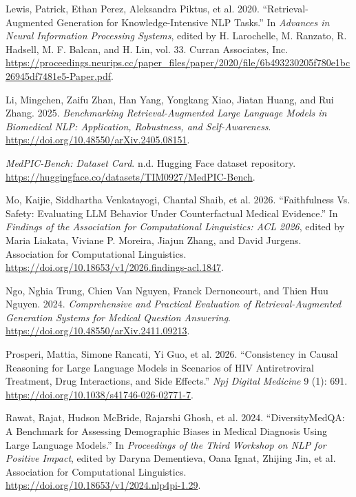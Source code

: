 \documentclass[
  english,
  11pt,
]{article}
\newlength{\cslhangindent}
\newenvironment{CSLReferences}[2] %
 {\begin{list}{}{%
  \setlength{\itemindent}{0pt}
  \setlength{\leftmargin}{0pt}
  \setlength{\parsep}{0pt}
  \ifodd #1
   \setlength{\leftmargin}{\cslhangindent}
   \setlength{\itemindent}{-1\cslhangindent}
  \fi
  \setlength{\itemsep}{#2\baselineskip}}}
 {\end{list}}
\begin{document}
\begin{CSLReferences}{1}{1}
Lewis, Patrick, Ethan Perez, Aleksandra Piktus, et al. 2020.
{``Retrieval-Augmented Generation for Knowledge-Intensive NLP Tasks.''}
In \emph{Advances in Neural Information Processing Systems}, edited by
H. Larochelle, M. Ranzato, R. Hadsell, M. F. Balcan, and H. Lin, vol.
33. Curran Associates, Inc.
\url{https://proceedings.neurips.cc/paper_files/paper/2020/file/6b493230205f780e1bc26945df7481e5-Paper.pdf}.

Li, Mingchen, Zaifu Zhan, Han Yang, Yongkang Xiao, Jiatan Huang, and Rui
Zhang. 2025. \emph{Benchmarking Retrieval-Augmented Large Language
Models in Biomedical NLP: Application, Robustness, and Self-Awareness}.
\url{https://doi.org/10.48550/arXiv.2405.08151}.

\emph{{MedPIC-Bench}: Dataset Card}. n.d. Hugging Face dataset
repository. \url{https://huggingface.co/datasets/TIM0927/MedPIC-Bench}.

Mo, Kaijie, Siddhartha Venkatayogi, Chantal Shaib, et al. 2026.
{``Faithfulness Vs. Safety: Evaluating {LLM} Behavior Under
Counterfactual Medical Evidence.''} In \emph{Findings of the
{A}ssociation for {C}omputational {L}inguistics: {ACL} 2026}, edited by
Maria Liakata, Viviane P. Moreira, Jiajun Zhang, and David Jurgens.
Association for Computational Linguistics.
\url{https://doi.org/10.18653/v1/2026.findings-acl.1847}.

Ngo, Nghia Trung, Chien Van Nguyen, Franck Dernoncourt, and Thien Huu
Nguyen. 2024. \emph{Comprehensive and Practical Evaluation of
Retrieval-Augmented Generation Systems for Medical Question Answering}.
\url{https://doi.org/10.48550/arXiv.2411.09213}.

Prosperi, Mattia, Simone Rancati, Yi Guo, et al. 2026. {``Consistency in
Causal Reasoning for Large Language Models in Scenarios of HIV
Antiretroviral Treatment, Drug Interactions, and Side Effects.''}
\emph{Npj Digital Medicine} 9 (1): 691.
\url{https://doi.org/10.1038/s41746-026-02771-7}.

Rawat, Rajat, Hudson McBride, Rajarshi Ghosh, et al. 2024.
{``{D}iversity{M}ed{QA}: A Benchmark for Assessing Demographic Biases in
Medical Diagnosis Using Large Language Models.''} In \emph{Proceedings
of the Third Workshop on NLP for Positive Impact}, edited by Daryna
Dementieva, Oana Ignat, Zhijing Jin, et al. Association for
Computational Linguistics.
\url{https://doi.org/10.18653/v1/2024.nlp4pi-1.29}.


\end{CSLReferences}
\end{document}
